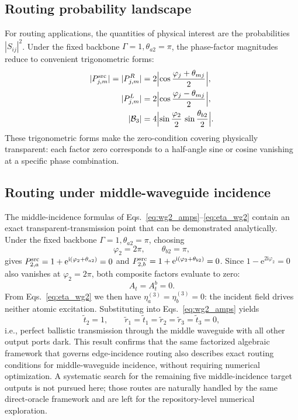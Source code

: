 \documentclass[aps,pra,reprint,superscriptaddress,nofootinbib,longbibliography,floatfix]{revtex4-2}
\newcommand{\ii}{\mathrm{i}}
\newcommand{\ee}{\mathrm{e}}
\newcommand{\ph}{\varphi}
\newcommand{\thbtwo}{\theta_{b2}}
\newcommand{\Bthree}{\mathcal{B}_3}
\begin{document}
\subsection{Routing probability landscape}

For routing applications, the quantities of physical interest are the probabilities $|S_{ij}|^2$.
Under the fixed backbone $\Gamma=1,\theta_{a2}=\pi$, the phase-factor magnitudes reduce to convenient trigonometric forms:
\begin{align}
|P_{j,m}^{\rm src}| = |P_{j,m}^{R}| &= 2\Bigl|\cos\frac{\ph_j+\theta_{mj}}{2}\Bigr|,\\
|P_{j,m}^{L}| &= 2\Bigl|\cos\frac{\ph_j-\theta_{mj}}{2}\Bigr|,\\
|\Bthree| &= 4\Bigl|\sin\frac{\ph_2}{2}\,\sin\frac{\thbtwo}{2}\Bigr|.
\label{eq:trig}
\end{align}
These trigonometric forms make the zero-condition covering physically transparent: each factor zero corresponds to a half-angle sine or cosine vanishing at a specific phase combination.

\subsection{Routing under middle-waveguide incidence}

The middle-incidence formulas of Eqs.~\eqref{eq:wg2_amps}--\eqref{eq:eta_wg2} contain an exact transparent-transmission point that can be demonstrated analytically.
Under the fixed backbone $\Gamma=1,\theta_{a2}=\pi$, choosing
\begin{equation}
  \ph_2 = 2\pi,\qquad \thbtwo = \pi,
\end{equation}
gives $P_{2,a}^{\rm src}=1+\ee^{\ii(\ph_2+\theta_{a2})}=0$ and $P_{2,b}^{\rm src}=1+\ee^{\ii(\ph_2+\theta_{b2})}=0$.
Since $1-\ee^{2\ii\ph_2}=0$ also vanishes at $\ph_2=2\pi$, both composite factors evaluate to zero:
\begin{equation}
  A_t = A_t^b = 0.
\end{equation}
From Eqs.~\eqref{eq:eta_wg2} we then have $\eta_a^{(3)}=\eta_b^{(3)}=0$: the incident field drives neither atomic excitation.
Substituting into Eqs.~\eqref{eq:wg2_amps} yields
\begin{equation}
  \tilde t_2 = 1,\qquad
  \tilde r_1 = \tilde t_1 = \tilde r_2 = \tilde r_3 = \tilde t_3 = 0,
\end{equation}
i.e., perfect ballistic transmission through the middle waveguide with all other output ports dark.
This result confirms that the same factorized algebraic framework that governs edge-incidence routing also describes exact routing conditions for middle-waveguide incidence, without requiring numerical optimization.
A systematic search for the remaining five middle-incidence target outputs is not pursued here; those routes are naturally handled by the same direct-oracle framework and are left for the repository-level numerical exploration.
\end{document}
